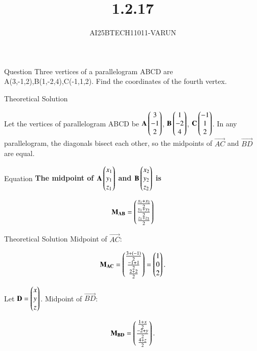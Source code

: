 \documentclass{beamer}
\title %
{1.2.17}
\author %
{AI25BTECH11011-VARUN}
\begin{document}
\frame{\titlepage}
\begin{frame}{Question}
Three vertices of a parallelogram ABCD are A(3,-1,2),B(1,-2,4),C(-1,1,2). Find the coordinates of the fourth vertex.
\end{frame}



\begin{frame}{Theoretical Solution}

Let the vertices of parallelogram ABCD be
$\Vec{A}\myvec{3\\-1\\2}$, $\Vec{ B}\myvec{1\\-2\\4}$, $\Vec{C}\myvec{-1\\1\\2}$.
In any parallelogram, the diagonals bisect each other, so the midpoints of $\vec{AC}$ and $\vec{BD}$ are equal.

\end{frame}

\begin{frame}{Equation}
\textbf{The  midpoint of $\mathbf{A}\begin{pmatrix}x_1\\y_1\\z_1\end{pmatrix}$ and $\mathbf{B}\begin{pmatrix}x_2\\y_2\\z_2\end{pmatrix}$ is}

\begin{align}
    \mathbf{M_{AB}} = \begin{pmatrix}\frac{x_1+x_2}{2} \\ \frac{y_1+y_2}{2} \\ \frac{z_1+z_2}{2}\end{pmatrix}
\end{align}
\end{frame}


\begin{frame}{Theoretical Solution}
Midpoint of $\vec{AC}$:

\begin{align}
\mathbf{M_{AC}}=\begin{pmatrix}\frac{3+(-1)}{2} \\ \frac{-1+1}{2} \\ \frac{2+2}{2}\end{pmatrix}=\begin{pmatrix}1\\0\\2\end{pmatrix}.
\end{align}

Let $\mathbf{D}=\begin{pmatrix}x\\y\\z\end{pmatrix}$. Midpoint of $\vec{BD}$:

\begin{align}
\mathbf{M_{BD}}=\begin{pmatrix}\frac{1+x}{2} \\ \frac{-2+y}{2} \\ \frac{4+z}{2}\end{pmatrix}.
\end{align}
\end{frame}
\end{document}
